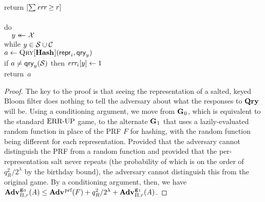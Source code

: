 \begin{figure*}
{      return $[\sum \textit{err} \geq r]$
    \\[6pt]
    \\[2pt]
      do\\
      $\hspace*{10pt} y \mathrel{\leftarrow\mkern-14mu\leftarrow} \mathcal{X}$\\
      while $y \in \mathcal{S} \cup \mathcal{C}$\\
      $a \gets \textsc{Qry}[\mathbf{Hash}\hspace{0.5pt}](\mathsf{repr}_i, \mathsf{qry}_y)$\\
      if $a \neq \mathsf{qry}_y(\mathcal{S})$ then $\textit{err}_i[y] \gets 1$\\
      return~$a$
  }
  {
  }
  {
  }
  \caption{Games 0--2 for proof of Theorem~\ref{thm:bf-priv-key-bound}.}
  \label{fig:bf-priv-salt-bound}
\end{figure*}

\begin{proof}

The key to the proof is that seeing the representation of a salted, keyed Bloom
filter does nothing to tell the adversary about what the responses to $\mathbf{Qry}\hspace{0.5pt}$
will be. Using a conditioning argument, we move from $\mathbf{G}\hspace{0.5pt}_0$, which is
equivalent to the standard $\textnormal{ERR\mbox{-}UP}$ game, to the alternate $\mathbf{G}\hspace{0.5pt}_1$ that uses a
lazily-evaluated random function in place of the PRF $F$ for hashing, with the
random function being different for each representation. Provided that the
adversary cannot distinguish the PRF from a random function and provided that
the per-representation salt never repeats (the probability of which is on the
order of $q_R^2/2^\lambda$ by the birthday bound), the adversary cannot
distinguish this from the original game. By a conditioning argument, then, we
have $\Adv{\game_0}_{\struct,r}(\advA) \le \Adv{\prf}(F) + q_R^2/2^\lambda + \Adv{\game_1}_{\struct,r}(\advA)$.


\end{proof}
